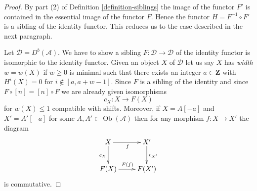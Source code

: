 \documentclass{stacks-project}
\theoremstyle{plain}
\theoremstyle{definition}
\theoremstyle{remark}
\numberwithin{equation}{subsection}
\def\Ob{\mathop{\mathrm{Ob}}\nolimits}
\begin{document}
\begin{proof}
By part (2) of Definition \ref{definition-siblings} the image of the functor
$F'$ is contained in the essential image of the functor $F$. Hence
the functor $H = F^{-1} \circ F'$ is a sibling of the identity functor.
This reduces us to the case described in the next paragraph.

\medskip\noindent
Let $\mathcal{D} = D^b(\mathcal{A})$. We have to show a sibling
$F : \mathcal{D} \to \mathcal{D}$ of the identity functor is
isomorphic to the identity functor. Given an object $X$ of $\mathcal{D}$
let us say $X$ has {\it width} $w = w(X)$ if $w \geq 0$ is minimal
such that there exists an integer $a \in \mathbf{Z}$ with $H^i(X) = 0$
for $i \not \in [a, a + w - 1]$. Since $F$ is a sibling of the identity
and since $F \circ [n] = [n] \circ F$ we are already given isomorphisms
$$
c_X : X \to F(X)
$$
for $w(X) \leq 1$ compatible with shifts. Moreover, if $X = A[-a]$ and
$X' = A'[-a]$ for some $A, A' \in \Ob(\mathcal{A})$ then for any morphism
$f : X \to X'$ the diagram
\begin{equation}
\label{equation-to-show}
\vcenter{
\xymatrix{
X \ar[d]_{c_X} \ar[r]_f &
X' \ar[d]^{c_{X'}} \\
F(X) \ar[r]^{F(f)} &
F(X')
}
}
\end{equation}
is commutative.


\end{proof}
\end{document}
